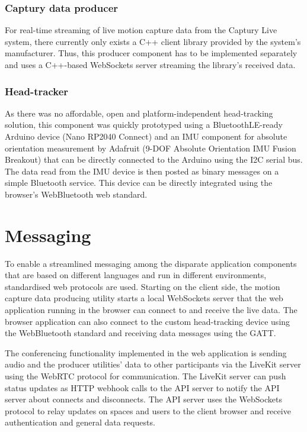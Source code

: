 \subsubsection{Captury data producer}

For real-time streaming of live motion capture data from the Captury Live system, there currently only exists a C++ client library provided by the system's manufacturer.
Thus, this producer component has to be implemented separately and uses a C++-based WebSockets server streaming the library's received data.

\subsubsection{Head-tracker}

As there was no affordable, open and platform-independent head-tracking solution, this component was quickly prototyped using a BluetoothLE-ready Arduino device (Nano RP2040 Connect) and an \ac{IMU} component for absolute orientation measurement by Adafruit (9-DOF Absolute Orientation IMU Fusion Breakout) that can be directly connected to the Arduino using the \ac{I2C} serial bus.
The data read from the \ac{IMU} device is then posted as binary messages on a simple Bluetooth service.
This device can be directly integrated using the browser's WebBluetooth web standard.

\section{Messaging}
\label{sec:messaging}

To enable a streamlined messaging among the disparate application components that are based on different languages and run in different environments, standardised web protocols are used.
Starting on the client side, the motion capture data producing utility starts a local WebSockets server that the web application running in the browser can connect to and receive the live data.
The browser application can also connect to the custom head-tracking device using the WebBluetooth standard and receiving data messages using the \ac{GATT}.

The conferencing functionality implemented in the web application is sending audio and the producer utilities' data to other participants via the LiveKit server using the WebRTC protocol for communication.
The LiveKit server can push status updates as \ac{HTTP} webhook calls to the API server to notify the \ac{API} server about connects and disconnects.
The \ac{API} server uses the WebSockets protocol to relay updates on spaces and users to the client browser and receive authentication and general data requests.

